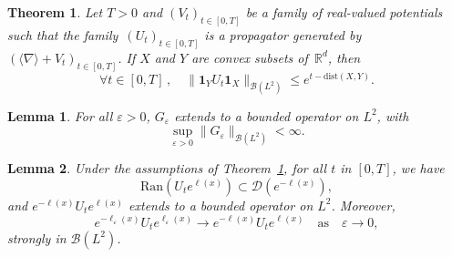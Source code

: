 \documentclass[10pt,a4paper]{amsart}
\newtheorem{theo}{Theorem}
\newtheorem{lemma}{Lemma}
\newcommand{\Teps}{{G_\varepsilon}}
\newcommand{\dXY}{{\mathrm{dist}(X,Y)}}
\begin{document}
%
\begin{theo}\label{th:max-vel}
Let $T>0$ and $(V_t)_{t\in[0,T]}$ be a family of real-valued potentials such that the family~$(U_t)_{t\in[0,T]}$ is a propagator generated by $(\langle\nabla\rangle+V_t)_{t\in[0,T]}$. If $X$ and $Y$ are convex subsets of~$\mathbb{R}^d$, then
\begin{equation}\label{eq:main-est}
        \forall t\in [0,T]\,,\quad \|\mathbf{1}_Y U_t \mathbf{1}_X\|_{\mathcal{B}(L^2)} \le e^{t-\dXY}.
    \end{equation}
\end{theo}

	\begin{lemma}\label{lm:unif-bound}
	    For all $\varepsilon>0$, $\Teps$ extends to a bounded operator on $L^2$, with
	    \begin{equation*}
	        \sup_{\varepsilon>0}\|\Teps\|_{\mathcal{B}(L^2)}<\infty.
	    \end{equation*}
	\end{lemma}

	\begin{lemma}\label{lm:bound_domain}Under the assumptions of Theorem~\ref{th:max-vel}, for all $t$ in $[0,T]$, we have
    \begin{equation*}
        \mathrm{Ran}(U_te^{\ell(x)})\subset\mathcal{D}(e^{-\ell(x)}),
    \end{equation*}
    and $e^{-\ell(x)}U_te^{\ell(x)}$ extends to a bounded operator on $L^2$. Moreover,
    \begin{equation*}
        e^{-\ell_\varepsilon(x)}U_te^{\ell_\varepsilon(x)} \to e^{-\ell(x)}U_te^{\ell(x)} \quad \text{as}\quad \varepsilon\to0,
    \end{equation*}
    strongly in $\mathcal{B}(L^2)$. 
\end{lemma}
\end{document}

